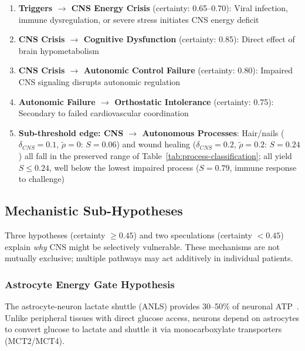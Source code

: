 \begin{enumerate}
    \item \textbf{Triggers $\rightarrow$ CNS Energy Crisis} (certainty: 0.65--0.70): Viral infection, immune dysregulation, or severe stress initiates CNS energy deficit~\cite{Komaroff2023}
    \item \textbf{CNS Crisis $\rightarrow$ Cognitive Dysfunction} (certainty: 0.85): Direct effect of brain hypometabolism~\cite{Nakatomi2014neuroinflammation,walitt2024deep}
    \item \textbf{CNS Crisis $\rightarrow$ Autonomic Control Failure} (certainty: 0.80): Impaired CNS signaling disrupts autonomic regulation~\cite{VanCampenEtAl2020}
    \item \textbf{Autonomic Failure $\rightarrow$ Orthostatic Intolerance} (certainty: 0.75): Secondary to failed cardiovascular coordination~\cite{VanCampenEtAl2020}
    \item \textbf{Sub-threshold edge: CNS $\rightarrow$ Autonomous Processes}: Hair/nails ($\delta_{CNS} = 0.1$, $\tilde{\rho} = 0$: $S = 0.06$) and wound healing ($\delta_{CNS} = 0.2$, $\tilde{\rho} = 0.2$: $S = 0.24$) all fall in the preserved range of Table~\ref{tab:process-classification}; all yield $S \leq 0.24$, well below the lowest impaired process ($S = 0.79$, immune response to challenge)
\end{enumerate}


\subsection{Mechanistic Sub-Hypotheses}

Three hypotheses (certainty $\geq 0.45$) and two speculations (certainty $< 0.45$) explain \emph{why} CNS might be selectively vulnerable. These mechanisms are not mutually exclusive; multiple pathways may act additively in individual patients.

\subsubsection{Astrocyte Energy Gate Hypothesis}

The astrocyte-neuron lactate shuttle (ANLS) provides 30--50\% of neuronal ATP~\cite{Pellerin1994,Magistretti2018}. Unlike peripheral tissues with direct glucose access, neurons depend on astrocytes to convert glucose to lactate and shuttle it via monocarboxylate transporters (MCT2/MCT4).


